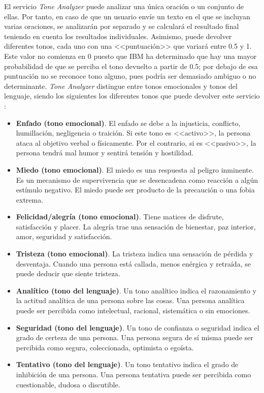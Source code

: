 \clearpage

El servicio \textit{Tone Analyzer} puede analizar una única oración o un conjunto de ellas. Por tanto, en caso de que un usuario envíe un texto en el que se incluyan varias oraciones, se analizarán por separado y se calculará el resultado final teniendo en cuenta los resultados individuales. Asimismo, puede devolver diferentes tonos, cada uno con una <<puntuación>> que variará entre 0.5 y 1. Este valor no comienza en 0 puesto que IBM ha determinado que hay una mayor probabilidad de que se perciba el tono devuelto a partir de 0.5; por debajo de esa puntuación no se reconoce tono alguno, pues podría ser demasiado ambiguo o no determinante. \textit{Tone Analyzer} distingue entre tonos emocionales y tonos del lenguaje, siendo los siguientes los diferentes tonos que puede devolver este servicio \cite{IBM2018}:

\begin{itemize}
	\item \textbf{Enfado (tono emocional)}. El enfado se debe a la injusticia, conflicto, humillación, negligencia o traición. Si este tono es <<activo>>, la persona ataca al objetivo verbal o físicamente. Por el contrario, si es <<pasivo>>, la persona tendrá mal humor y sentirá tensión y hostilidad.
	\item \textbf{Miedo (tono emocional)}. El miedo es una respuesta al peligro inminente. Es un mecanismo de supervivencia que se desencadena como reacción a algún estímulo negativo. El miedo puede ser producto de la precaución o una fobia extrema.
	\item \textbf{Felicidad/alegría (tono emocional)}. Tiene matices de disfrute, satisfacción y placer. La alegría trae una sensación de bienestar, paz interior, amor, seguridad y satisfacción.
	\item \textbf{Tristeza (tono emocional)}. La tristeza indica una sensación de pérdida y desventaja. Cuando una persona está callada, menos enérgica y retraída, se puede deducir que siente tristeza.
	\item \textbf{Analítico (tono del lenguaje)}. Un tono analítico indica el razonamiento y la actitud analítica de una persona sobre las cosas. Una persona analítica puede ser percibida como intelectual, racional, sistemática o sin emociones.
	\item \textbf{Seguridad (tono del lenguaje)}. Un tono de confianza o seguridad indica el grado de certeza de una persona. Una persona segura de sí misma puede ser percibida como segura, coleccionada, optimista o egoísta.
	\item \textbf{Tentativo (tono del lenguaje)}. Un tono tentativo indica el grado de inhibición de una persona. Una persona tentativa puede ser percibida como cuestionable, dudosa o discutible.
\end{itemize}

